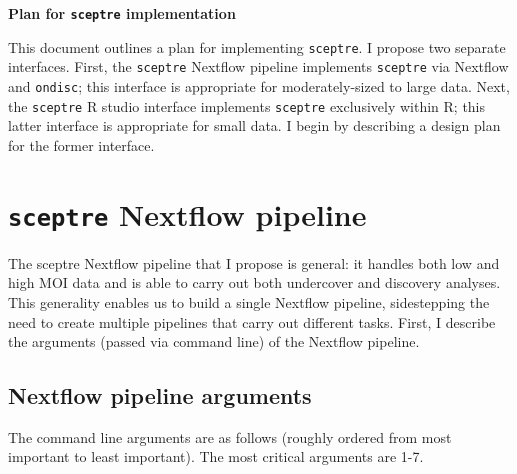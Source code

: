 \documentclass[12pt]{article}
\begin{document}
\begin{center}
\textbf{Plan for \texttt{sceptre} implementation}
\end{center}

This document outlines a plan for implementing \texttt{sceptre}. I propose two separate interfaces. First, the \texttt{sceptre} Nextflow pipeline implements \texttt{sceptre} via Nextflow and \texttt{ondisc}; this interface is appropriate for moderately-sized to large data. Next, the \texttt{sceptre} R studio interface implements \texttt{sceptre} exclusively within R; this latter interface is appropriate for small data. I begin by describing a design plan for the former interface.

\section{\texttt{sceptre} Nextflow pipeline}

The sceptre Nextflow pipeline that I propose is general:  it handles both low and high MOI data and is able to carry out both undercover and discovery analyses. This generality enables us to build a single Nextflow pipeline, sidestepping the need to create multiple pipelines that carry out different tasks. First, I describe the arguments (passed via command line) of the Nextflow pipeline.

\subsection*{Nextflow pipeline arguments}

The command line arguments are as follows (roughly ordered from most important to least important). The most critical arguments are 1-7.
\end{document}
